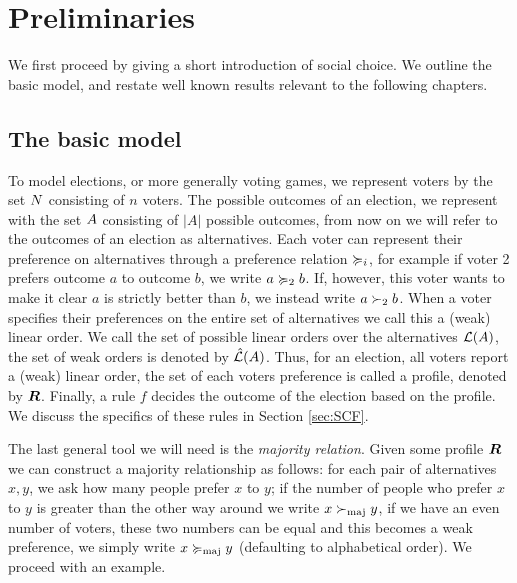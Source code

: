 \chapter{Preliminaries}
\label{chap: preliminaries}
We first proceed by giving a short introduction of social choice. We outline the basic model, and restate well known results relevant to the following chapters.

\section{The basic model}
To model elections, or more generally voting games, we represent voters by the set $N$ consisting of $n$ voters. The possible outcomes of an election, we represent with the set $A$ consisting of $|A|$ possible outcomes, from now on we will refer to the outcomes of an election as alternatives. Each voter can represent their preference on alternatives through a preference relation $\succcurlyeq_i$, for example if voter 2 prefers outcome $a$ to outcome $b$, we write $a \succcurlyeq_2 b$. If, however, this voter wants to make it clear $a$ is strictly better than $b$, we instead write $a \succ_2 b$. When a voter specifies their preferences on the entire set of alternatives we call this a (weak) linear order. We call the set of possible linear orders over the alternatives $\mathcal{L}(A)$, the set of weak orders is denoted by $\hat{\mathcal{L}}(A)$. Thus, for an election, all voters report a (weak) linear order, the set of each voters preference is called a profile, denoted by $\boldsymbol{R}$. Finally, a rule $f$ decides the outcome of the election based on the profile. We discuss the specifics of these rules in Section \cref{sec:SCF}.

The last general tool we will need is the \emph{majority relation}. Given some
profile $\boldsymbol{R}$ we can construct a majority relationship as follows:
for each pair of alternatives $x,y$, we ask how many people prefer $x$ to $y$;
if the number of people who prefer $x$ to $y$ is greater than the other way
around we write $x  \succ_{\textnormal{maj}} y$, if we have an even number of voters, these two
numbers can be equal and this becomes a weak preference, we simply write $x
	\succcurlyeq_{\textnormal{maj}} y$ (defaulting to alphabetical order). We proceed with an
example.

